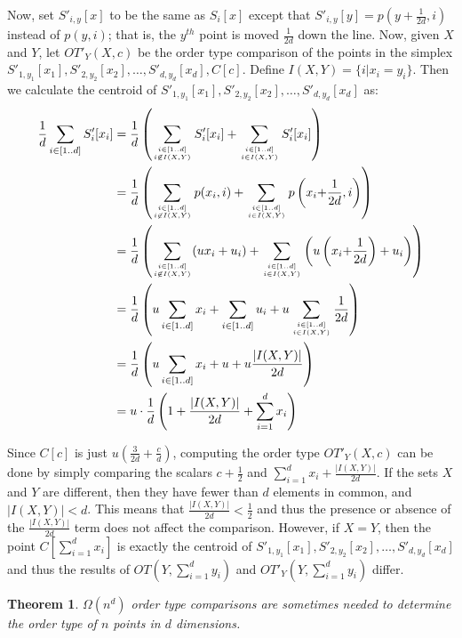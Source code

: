 \documentclass[leqno,12pt]{article}
\newtheorem{theorem}{Theorem}
\begin{document}
Now, set $S'_{i,y}[x]$ to be the same as $S_i[x]$ except that $S'_{i,y}[y]=p(y{+}\frac{1}{2d},i)$ instead of $p(y,i)$; that is, the $y^{th}$ point is moved $\frac{1}{2d}$ down the line.  Now, given $X$ and $Y$, let $OT'_Y(X,c)$ be the order type comparison of the points in the simplex $S'_{1,y_1}[x_1], S'_{2,y_2}[x_2], \ldots, S'_{d,y_d}[x_d], C[c]$. 
Define $I(X,Y)=\{i|x_i=y_i\}$.
Then we calculate the centroid of $S'_{1,y_1}[x_1], S'_{2,y_2}[x_2], \ldots,  S'_{d,y_d}[x_d]$ as:
\begin{align*}
\frac{1}{d} \sum_{i\in [1..d]} S'_i[x_i] &=
\frac{1}{d} \left( \sum_{i\in [1..d]\atop i \not \in I(X,Y)} S'_i[x_i] + \sum_{i\in [1..d]\atop i\in I(X,Y)} S'_i[x_i] \right) \\
&= \frac{1}{d} \left( \sum_{i\in [1..d]\atop i \not \in I(X,Y)} p(x_i,i) + \sum_{i\in [1..d]\atop i \in I(X,Y)} p\left(x_i{+}\frac{1}{2d}, i\right)\right) \\
&= \frac{1}{d} \left( \sum_{i\in [1..d]\atop i \not \in I(X,Y)} (ux_i+u_i) + 
\sum_{i\in [1..d]\atop i \in I(X,Y)} \left( u\left(x_i{+}\frac1{2d}\right) + u_i  \right)\right) \\
&= \frac{1}{d} \left( u\sum_{i\in[1..d]} x_i +\sum_{i\in[1..d]} u_i +  u\sum_{i\in [1..d]\atop i \in I(X,Y)}\frac{1}{2d} \right) \\
&= \frac{1}{d} \left( u \sum_{i\in[1..d]} x_i +u + u\frac{|I(X,Y)|}{2d} \right) \\
&=u \cdot \frac{1}{d} \left( 1+\frac{|I(X,Y)|}{2d}+  \sum_{i=1}^d x_i \right)
\end{align*}



Since $C[c]$ is just $u \left( \frac{3}{2d}+ \frac{c}{d} \right)$, computing the order type $OT'_Y(X,c)$ can be done by simply comparing the scalars $c+\frac{1}{2}$ and
$\sum_{i=1}^d x_i +\frac{|I(X,Y)|}{2d}$. If the sets $X$ and $Y$ are different, then they have 
fewer than $d$ elements
in common, and $|I(X,Y)|<d$. This means that $\frac{|I(X,Y)|}{2d} <\frac{1}{2}$ and thus the presence or absence of the $\frac{|I(X,Y)|}{2d}$ term does not affect the comparison. However, if $X=Y$, then the point $C[\sum_{i=1}^d x_i]$ is exactly the centroid of 
$S'_{1,y_1}[x_1], S'_{2,y_2}[x_2], \ldots, S'_{d,y_d}[x_d]$ and thus the results of $OT(Y,\sum_{i=1}^d y_i)$ and 
$OT'_Y(Y,\sum_{i=1}^d y_i)$ differ.

\begin{theorem}
$\Omega(n^d)$ order type comparisons are sometimes needed to determine the order type of $n$ points in $d$ dimensions.
\end{theorem}
\end{document}
